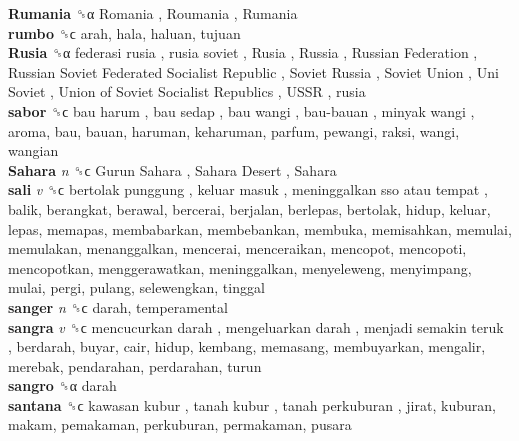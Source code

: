 \textbf{Rumania} ␝α   Romania ,  Roumania ,  Rumania   \\
\textbf{rumbo} ␝ϲ  arah, hala, haluan, tujuan  \\
\textbf{Rusia} ␝α   federasi rusia ,  rusia soviet ,  Rusia ,  Russia ,  Russian Federation ,  Russian Soviet Federated Socialist Republic ,  Soviet Russia ,  Soviet Union ,  Uni Soviet ,  Union of Soviet Socialist Republics ,  USSR , rusia  \\
\textbf{sabor} ␝ϲ   bau harum ,  bau sedap ,  bau wangi ,  bau-bauan ,  minyak wangi , aroma, bau, bauan, haruman, keharuman, parfum, pewangi, raksi, wangi, wangian  \\
\textbf{Sahara} \emph{n}  ␝ϲ   Gurun Sahara ,  Sahara Desert ,  Sahara   \\
\textbf{sali} \emph{v}  ␝ϲ   bertolak punggung ,  keluar masuk ,  meninggalkan sso atau tempat , balik, berangkat, berawal, bercerai, berjalan, berlepas, bertolak, hidup, keluar, lepas, memapas, membabarkan, membebankan, membuka, memisahkan, memulai, memulakan, menanggalkan, mencerai, menceraikan, mencopot, mencopoti, mencopotkan, menggerawatkan, meninggalkan, menyeleweng, menyimpang, mulai, pergi, pulang, selewengkan, tinggal  \\
\textbf{sanger} \emph{n}  ␝ϲ  darah, temperamental  \\
\textbf{sangra} \emph{v}  ␝ϲ   mencucurkan darah ,  mengeluarkan darah ,  menjadi semakin teruk , berdarah, buyar, cair, hidup, kembang, memasang, membuyarkan, mengalir, merebak, pendarahan, perdarahan, turun  \\
\textbf{sangro} ␝α  darah  \\
\textbf{santana} ␝ϲ   kawasan kubur ,  tanah kubur ,  tanah perkuburan , jirat, kuburan, makam, pemakaman, perkuburan, permakaman, pusara  \\
